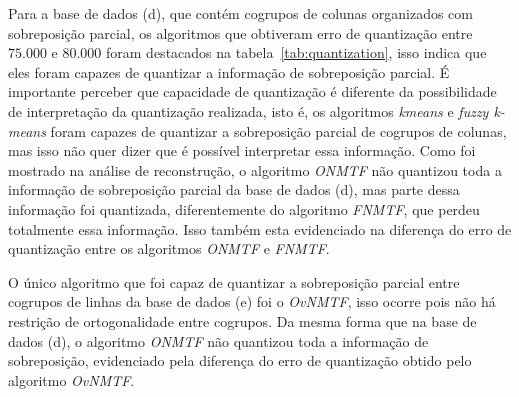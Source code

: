 \documentclass[
    12pt,                %
    oneside,            %
    a4paper,            %
    english,            %
    brazil                %
    ]{abntex2ppgsi}
\begin{document}
Para a base de dados (d), que contém cogrupos de colunas organizados com sobreposição parcial, os algoritmos que obtiveram erro de quantização entre $75.000$ e $80.000$ foram destacados na tabela~\ref{tab:quantization}, isso indica que eles foram capazes de quantizar a informação de sobreposição parcial.
É importante perceber que capacidade de quantização é diferente da possibilidade de interpretação da quantização realizada, isto é, os algoritmos \textit{kmeans} e \textit{fuzzy k-means} foram capazes de quantizar a sobreposição parcial de cogrupos de colunas, mas isso não quer dizer que é possível interpretar essa informação.
Como foi mostrado na análise de reconstrução, o algoritmo \textit{ONMTF} não quantizou toda a informação de sobreposição parcial da base de dados (d), mas parte dessa informação foi quantizada, diferentemente do algoritmo \textit{FNMTF}, que perdeu totalmente essa informação.
Isso também esta evidenciado na diferença do erro de quantização entre os algoritmos \textit{ONMTF} e \textit{FNMTF}.

O único algoritmo que foi capaz de quantizar a sobreposição parcial entre cogrupos de linhas da base de dados (e) foi o \textit{OvNMTF}, isso ocorre pois não há restrição de ortogonalidade entre cogrupos.
Da mesma forma que na base de dados (d), o algoritmo \textit{ONMTF} não quantizou toda a informação de sobreposição, evidenciado pela diferença do erro de quantização obtido pelo algoritmo \textit{OvNMTF}.



\end{document}
